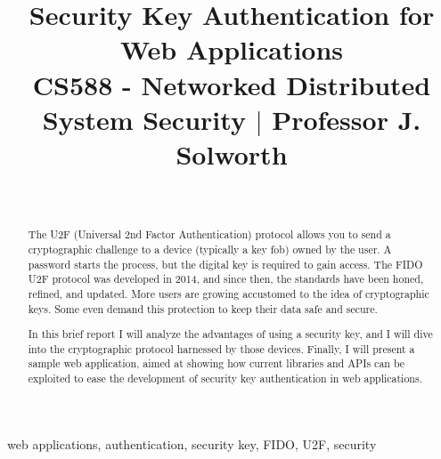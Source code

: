 \documentclass[12pt, conference]{IEEEtran}
\begin{document}
\title{\textbf{Security Key Authentication for Web Applications}\\
{\small CS588 - Networked Distributed System Security $\mid$ Professor J. Solworth}
}

\author{
\\
}

\maketitle
\thispagestyle{plain}
\pagestyle{plain}
\onehalfspacing

\begin{abstract}
    The U2F (Universal 2nd Factor Authentication) protocol allows you to send a cryptographic challenge to a device (typically a key fob) owned by the user. A password starts the process, but the digital key is required to gain access. The FIDO U2F protocol was developed in 2014, and since then, the standards have been honed, refined, and updated. More users are growing accustomed to the idea of cryptographic keys. Some even demand this protection to keep their data safe and secure.

    In this brief report I will analyze the advantages of using a security key, and I will dive into the cryptographic protocol harnessed by those devices. Finally, I will present a sample web application, aimed at showing how current libraries and APIs can be exploited to ease the development of security key authentication in web applications.
\end{abstract}

\begin{IEEEkeywords}
    web applications, authentication, security key, FIDO, U2F, security
\end{IEEEkeywords}








\vspace{12pt}



\end{document}
